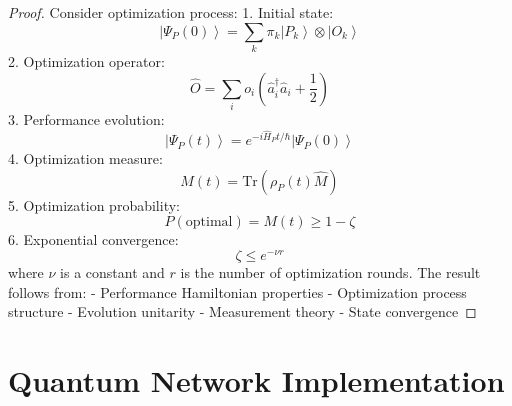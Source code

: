 \documentclass[12pt]{article}
\newcommand{\ket}[1]{\left|#1\right\rangle}
\newcommand{\tr}{\text{Tr}}
\newcommand{\op}[1]{\hat{#1}}
\begin{document}
\begin{proof}
Consider optimization process:
1. Initial state:
\begin{equation}
\ket{\Psi_P(0)} = \sum_k \pi_k\ket{P_k} \otimes \ket{O_k}
\end{equation}
2. Optimization operator:
\begin{equation}
\op{O} = \sum_i o_i(\op{a}_i^\dagger\op{a}_i + \frac{1}{2})
\end{equation}
3. Performance evolution:
\begin{equation}
\ket{\Psi_P(t)} = e^{-i\op{H}_Pt/\hbar}\ket{\Psi_P(0)}
\end{equation}
4. Optimization measure:
\begin{equation}
M(t) = \tr(\rho_P(t)\op{M})
\end{equation}
5. Optimization probability:
\begin{equation}
P(\text{optimal}) = M(t) \geq 1 - \zeta
\end{equation}
6. Exponential convergence:
\begin{equation}
\zeta \leq e^{-\nu r}
\end{equation}
where $\nu$ is a constant and $r$ is the number of optimization rounds.
The result follows from:
- Performance Hamiltonian properties
- Optimization process structure
- Evolution unitarity
- Measurement theory
- State convergence
\end{proof}
\section{Quantum Network Implementation}
\end{document}
